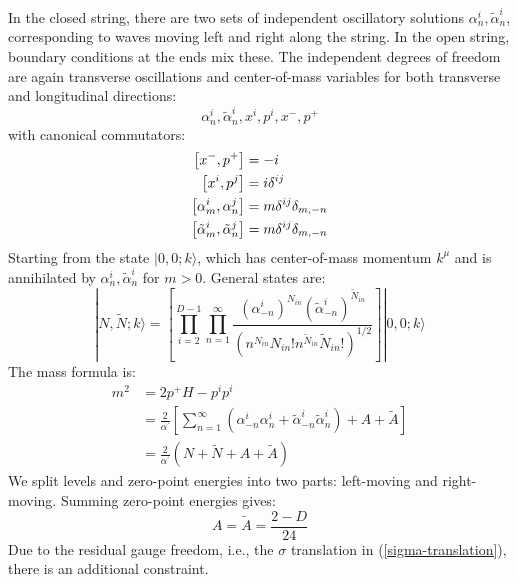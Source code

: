 In the closed string, there are two sets of independent oscillatory solutions $\alpha_{n}^{i}, \tilde{\alpha}_{n}^{i}$, corresponding to waves moving left and right along the string. 
In the open string, boundary conditions at the ends mix these. The independent degrees of freedom are again transverse oscillations and center-of-mass variables for both transverse and longitudinal directions: 
\begin{equation}
	\alpha_{n}^{i}, \tilde{\alpha}_{n}^{i}, x^{i}, p^{i}, x^{-}, p^{+}
\end{equation}
with canonical commutators: 
\begin{subequations}
	\begin{align}
		\left[x^{-}, p^{+}\right]&=-i \\
		\left[x^{i}, p^{j}\right]&=i \delta^{i j} \\
		\left[\alpha_{m}^{i}, \alpha_{n}^{j}\right]&=m \delta^{i j} \delta_{m,-n} \\
		\left[\tilde{\alpha}_{m}^{i}, \tilde{\alpha}_{n}^{j}\right]&=m \delta^{i j} \delta_{m,-n} 
	\end{align}
\end{subequations}
Starting from the state $|0,0;k \rangle$, which has center-of-mass momentum $k^\mu$ and is annihilated by $\alpha_{n}^{i}, \tilde{\alpha}_{n}^{i}$ for $m>0$. 
General states are: 
\begin{equation}
	|N, \tilde{N} ; k\rangle=\left[
	\prod_{i=2}^{D-1} \prod_{n=1}^{\infty} \frac{(\alpha_{-n}^{i})^{N_{i n}}(\tilde{\alpha}_{-n}^{i})^{\tilde{N}_{i n}}}{(n^{N_{i n}} N_{i n}! n^{\tilde{N}_{i n}} \tilde{N}_{i n}!)^{1 / 2}}
	\right] |0,0 ;  k\rangle
\end{equation}
The mass formula is: 
\begin{equation}
	\begin{aligned}
		m^{2} &=2 p^{+} H-p^{i} p^{i} \\
		&=\frac{2}{\alpha^{\prime}}\left[\sum_{n=1}^{\infty}\left(\alpha_{-n}^{i} \alpha_{n}^{i}+\tilde{\alpha}_{-n}^{i} \tilde{\alpha}_{n}^{i}\right)+A+\tilde{A}\right] \\
		&=\frac{2}{\alpha^{\prime}}(N+\tilde{N}+A+\tilde{A})
	\end{aligned}
\end{equation}
We split levels and zero-point energies into two parts: left-moving and right-moving. Summing zero-point energies gives: 
\begin{equation}
	A=\tilde{A}=\frac{2-D}{24}
\end{equation}
Due to the residual gauge freedom, i.e., the $\sigma$ translation in (\ref{sigma-translation}), there is an additional constraint. 
